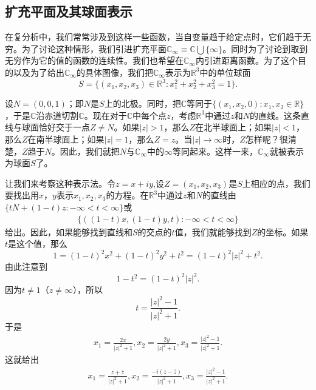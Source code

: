 \subsection{扩充平面及其球面表示}\label{subsection0020106}
在复分析中，我们常常涉及到这样一些函数，当自变量趋于给定点时，它们趋于无穷。为了讨论这种情形，我们引进扩充平面$\mathbb{C}_{\infty}\equiv \mathbb{C} \bigcup \{\infty\}$。同时为了讨论到取到无穷作为它的值的函数的连续性。我们也希望在$\mathbb{C}_{\infty}$内引进距离函数。为了这个目的以及为了给出$\mathbb{C}_{\infty}$的具体图像，我们把$\mathbb{C}_{\infty}$表示为$\mathbb{R}^3$中的单位球面
\[
S = \{(x_1,x_2,x_3) \in \mathbb{R}^3:x_1^2 + x_2^2 + x_3^2=1\}.
\]

设$N=(0, 0,1)$；即$N$是$S$上的北极。同时，把$\mathbb{C}$等同于$\{(x_1,x_2,0):x_1,x_2 \in \mathbb{R}\}$，于是$\mathbb{C}$沿赤道切割$\mathbb{C}$。现在对于$\mathbb{C}$中每个点$z$，考虑$\mathbb{R}^3$中通过$z$和$N$的直线。这条直线与球面恰好交于一点$Z \neq N$。如果$|z| > 1$，那么$Z$在北半球面上；如果$|z|<1$，那么$Z$在南半球面上；如果$|z|=1$，那么$Z = z$。当$|z| \to \infty$时，$Z$怎样呢？很清楚，$Z$趋于$N$。因此，我们就把$N$与$\mathbb{C}_{\infty}$中的$\infty$等同起来。这样一来，$\mathbb{C}_{\infty}$就被表示为球面$S$了。

让我们来考察这种表示法。令$z=x+iy$,设$Z = (x_1, x_2, x_3)$是$S$上相应的点，我们要找出用$x$，$y$表示$x_1, x_2, x_3$的方程。在$\mathbb{R}^3$中通过$z$和$N$的直线由$\{tN + (1-t)z:-\infty<t<\infty\}$或
\begin{gather}\label{equ002010601}
\{((1-t)x, (1-t)y, t): -\infty < t < \infty\}
\end{gather}
给出。因此，如果能够找到直线和$S$的交点的$t$值，我们就能够找到$Z$的坐标。如果$t$是这个值，那么
\[
1 = (1-t)^2x^2 + (1-t)^2y^2 + t^2 = (1-t)^2|z|^2 + t^2.
\]
由此注意到
\[
1-t^2 = (1-t)^2|z|^2.
\]
因为$t \neq 1$（$z \neq \infty$），所以
\[
t = \frac{|z|^2-1}{|z|^2+1}.
\]
于是
\begin{gather}\label{equ002010602}
x_1 = \frac{2x}{|z|^2+1}, x_2 = \frac{2y}{|z|^2+1}, x_3 = \frac{|z|^2-1}{|z|^2+1}.
\end{gather}
这就给出
\begin{gather}\label{equ002010603}
x_1 = \frac{z + \bar{z}}{|z|^2+1}, x_2 = \frac{-i(z-\bar{z})}{|z|^2+1}, x_3 = \frac{|z|^2-1}{|z|^2+1}.
\end{gather}

